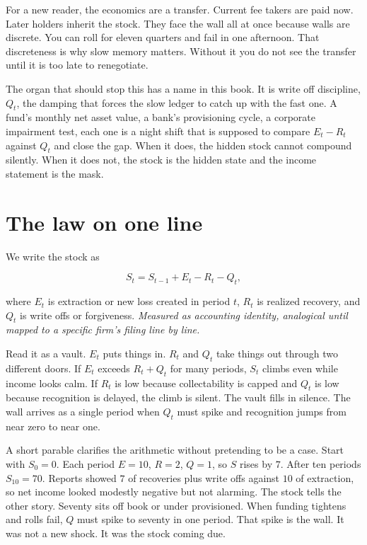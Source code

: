 For a new reader, the economics are a transfer. Current fee takers are paid now. Later holders inherit the stock. They face the wall all at once because walls are discrete. You can roll for eleven quarters and fail in one afternoon. That discreteness is why slow memory matters. Without it you do not see the transfer until it is too late to renegotiate.

The organ that should stop this has a name in this book. It is write off discipline, $Q_t$, the damping that forces the slow ledger to catch up with the fast one. A fund's monthly net asset value, a bank's provisioning cycle, a corporate impairment test, each one is a night shift that is supposed to compare $E_t - R_t$ against $Q_t$ and close the gap. When it does, the hidden stock cannot compound silently. When it does not, the stock is the hidden state and the income statement is the mask.

\section{The law on one line}

We write the stock as

\begin{equation}
S_t = S_{t-1} + E_t - R_t - Q_t,
\label{eq:Stimeline}
\end{equation}

where $E_t$ is extraction or new loss created in period $t$, $R_t$ is realized recovery, and $Q_t$ is write offs or forgiveness. \textit{Measured as accounting identity, analogical until mapped to a specific firm's filing line by line.}

Read it as a vault. $E_t$ puts things in. $R_t$ and $Q_t$ take things out through two different doors. If $E_t$ exceeds $R_t + Q_t$ for many periods, $S_t$ climbs even while income looks calm. If $R_t$ is low because collectability is capped and $Q_t$ is low because recognition is delayed, the climb is silent. The vault fills in silence. The wall arrives as a single period when $Q_t$ must spike and recognition jumps from near zero to near one.

A short parable clarifies the arithmetic without pretending to be a case. Start with $S_0 = 0$. Each period $E = 10$, $R = 2$, $Q = 1$, so $S$ rises by $7$. After ten periods $S_{10} = 70$. Reports showed $7$ of recoveries plus write offs against $10$ of extraction, so net income looked modestly negative but not alarming. The stock tells the other story. Seventy sits off book or under provisioned. When funding tightens and rolls fail, $Q$ must spike to seventy in one period. That spike is the wall. It was not a new shock. It was the stock coming due.

